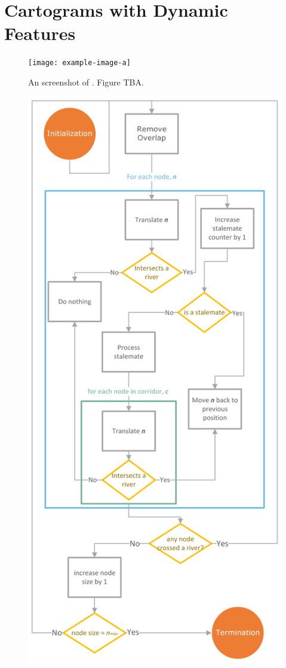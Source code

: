 \section{Cartograms with Dynamic Features}

{
\begin{figure}[tb!]
    \centering
    \texttt{[image: example-image-a]}
    \caption{An screenshot of \software. Figure TBA.}
    \label{fig:overview}
\end{figure}
}

{
\begin{figure}[tb!]
    \centering
    \includegraphics[width=\columnwidth]{figure/flowchart.png}

\end{figure}}
